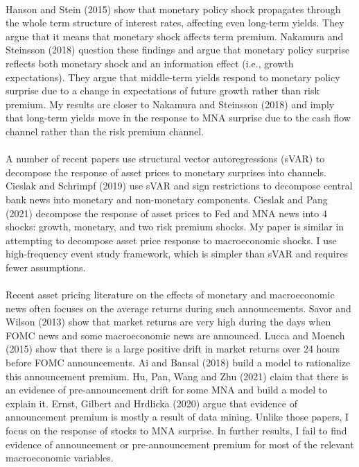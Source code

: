 \documentclass[12pt]{article}
\begin{document}
\paragraph{}
Hanson and Stein (2015) show that monetary policy shock propagates through the whole term structure of interest rates, affecting even long-term yields. They argue that it means that monetary shock affects term premium. Nakamura and Steinsson (2018) question these findings and argue that monetary policy surprise reflects both monetary shock and an information effect (i.e., growth expectations). They argue that middle-term yields respond to monetary policy surprise due to a change in expectations of future growth rather than risk premium. My results are closer to Nakamura and Steinsson (2018) and imply that long-term yields move in the response to MNA surprise due to the cash flow channel rather than the risk premium channel.
\paragraph{}
A number of recent papers use structural vector autoregressions (sVAR) to decompose the response of asset prices to monetary surprises into channels. Cieslak and Schrimpf (2019) use sVAR and sign restrictions to decompose central bank news into monetary and non-monetary components. Cieslak and Pang (2021) decompose the response of asset prices to Fed and MNA news into 4 shocks: growth, monetary, and two risk premium shocks. My paper is similar in attempting to decompose asset price response to macroeconomic shocks. I use high-frequency event study framework, which is simpler than sVAR and requires fewer assumptions. 
\paragraph{}
Recent asset pricing literature on the effects of monetary and macroeconomic news often focuses on the average returns during such announcements. Savor and Wilson (2013) show that market returns are very high during the days when FOMC news and some macroeconomic news are announced. Lucca and Moench (2015) show that there is a large positive drift in market returns over 24 hours before FOMC announcements. Ai and Bansal (2018) build a model to rationalize this announcement premium. Hu, Pan, Wang and Zhu (2021) claim that there is an evidence of pre-announcement drift for some MNA and build a model to explain it. Ernst, Gilbert and Hrdlicka (2020) argue that evidence of announcement premium is mostly a result of data mining. Unlike those papers, I focus on the response of stocks to MNA surprise. In further results, I fail to find evidence of announcement or pre-announcement premium for most of the relevant macroeconomic variables.
\end{document}
